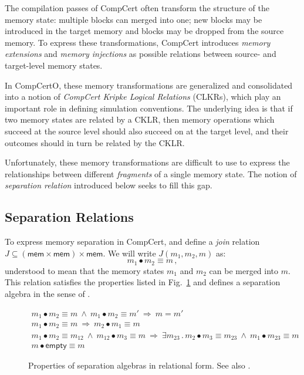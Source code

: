 \documentclass[acmsmall,screen,review,anonymous,nonacm]{acmart}
\newcommand{\kw}[1]{\ensuremath{ \mathsf{#1} }}
\begin{document}
The compilation passes of CompCert
often transform the structure of the memory state:
multiple blocks can merged into one;
new blocks may be introduced in the target memory
and blocks may be dropped from the source memory.
To express these transformations,
CompCert introduces \emph{memory extensions} and \emph{memory injections}
as possible relations between source- and target-level memory states.

In CompCertO,
these memory transformations are generalized and consolidated
into a notion of \emph{CompCert Kripke Logical Relations} (CLKRs),
which play an important role in defining simulation conventions.
The underlying idea is that
if two memory states are related by a CKLR,
then memory operations which succeed at the source level
should also succeed on at the target level,
and their outcomes should in turn be related
by the CKLR.

Unfortunately,
these memory transformations are difficult to use
to express the relationships between
different \emph{fragments} of a single memory state.
The notion of \emph{separation relation} introduced below
seeks to fill this gap.

\subsection{Separation Relations} %

To express memory separation in CompCert,
and define a \emph{join} relation
$J \subseteq (\kw{mem} \times \kw{mem}) \times \kw{mem}$.
We will write $J(m_1, m_2, m)$ as:
\[
  m_1 \bullet m_2 \equiv m
  \,,
\]
understood to mean that
the memory states $m_1$ and $m_2$
can be merged into $m$.
This relation satisfies the properties listed in Fig.~\ref{fig:sepalg}
and defines a separation algebra in the sense of \citet{freshlook}.

\begin{figure}
  \begin{gather*}
    m_1 \bullet m_2 \equiv m \:\wedge\:
      m_1 \bullet m_2 \equiv m' \:\Rightarrow\:
      m = m'
      \\
    m_1 \bullet m_2 \equiv m \:\Rightarrow\:
      m_2 \bullet m_1 \equiv m
      \\
    m_1 \bullet m_2 \equiv m_{12} \:\wedge\:
      m_{12} \bullet m_3 \equiv m \:\Rightarrow\:
      \exists m_{23} \mathrel.
      m_2 \bullet m_3 \equiv m_{23} \:\wedge\:
      m_1 \bullet m_{23} \equiv m
      \\
    m \bullet \kw{empty} \equiv m
  \end{gather*}
  \caption{Properties of separation algebras
    in relational form. See also \citet{freshlook}.}
  \label{fig:sepalg}
\end{figure}
\end{document}
